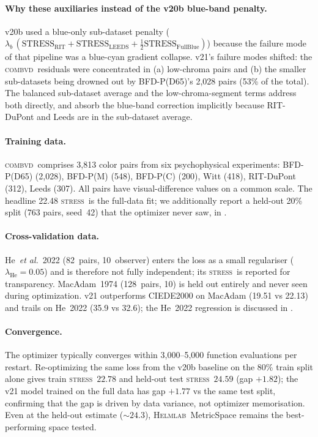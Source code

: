 \documentclass[11pt, twocolumn]{article}
\newcommand{\helmlab}{\textsc{Helmlab}}
\newcommand{\stress}{\textsc{stress}}
\newcommand{\combvd}{\textsc{combvd}}
\newcommand{\etal}{\textit{et al.}}
\begin{document}
\paragraph{Why these auxiliaries instead of the v20b blue-band
penalty.}
v20b used a blue-only sub-dataset penalty
($\lambda_b\,(\mathrm{STRESS}_\mathrm{RIT}+\mathrm{STRESS}_\mathrm{LEEDS}+\tfrac{1}{2}\mathrm{STRESS}_\mathrm{FullBlue})$)
because the failure mode of that pipeline was a blue-cyan gradient
collapse. v21's failure modes shifted: the \combvd\ residuals were
concentrated in (a) low-chroma pairs and (b) the smaller
sub-datasets being drowned out by BFD-P(D65)'s 2{,}028 pairs (53\%
of the total). The balanced sub-dataset average and the
low-chroma-segment terms address both directly, and absorb the
blue-band correction implicitly because RIT-DuPont and Leeds are
in the sub-dataset average.

\paragraph{Training data.}
\combvd\ comprises 3{,}813 color pairs from six psychophysical
experiments: BFD-P(D65) (2{,}028), BFD-P(M) (548), BFD-P(C) (200),
Witt (418), RIT-DuPont (312), Leeds (307). All pairs have
visual-difference values on a common scale. The headline 22.48
\stress\ is the full-data fit; we additionally report a held-out
20\% split (763 pairs, seed~42) that the optimizer never saw,
in .

\paragraph{Cross-validation data.}
He~\etal\ 2022 (82~pairs, 10\textdegree\ observer) enters the loss as
a small regulariser ($\lambda_\mathrm{He}\!=\!0.05$) and is
therefore not fully independent; its \stress\ is reported for
transparency. MacAdam~1974 (128~pairs, 10\textdegree) is held out
entirely and never seen during optimization. v21 outperforms
CIEDE2000 on MacAdam (19.51 vs 22.13) and trails on He~2022
(35.9 vs 32.6); the He~2022 regression is discussed in
.

\paragraph{Convergence.}
The optimizer typically converges within 3{,}000--5{,}000 function
evaluations per restart. Re-optimizing the same loss from the
v20b baseline on the 80\% train split alone gives train \stress\
$22.78$ and held-out test \stress\ $24.59$ (gap $+1.82$); the v21
model trained on the full data has gap $+1.77$ vs the same test
split, confirming that the gap is driven by data variance, not
optimizer memorisation. Even at the held-out estimate ($\sim 24.3$),
\helmlab\ MetricSpace remains the best-performing space tested.
\end{document}
